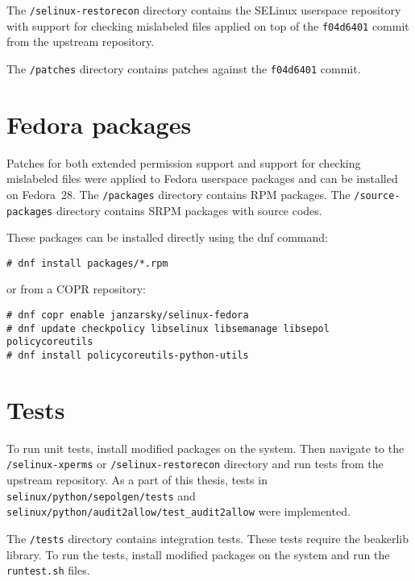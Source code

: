 The \texttt{/selinux-restorecon} directory contains the SELinux userspace
repository with support for checking mislabeled files applied on top of the
\texttt{f04d6401} commit from the upstream repository.

The \texttt{/patches} directory contains patches against the \texttt{f04d6401}
commit.

\section{Fedora packages}

Patches for both extended permission support and support for checking mislabeled
files were applied to Fedora userspace packages and can be installed on
Fedora~28. The \texttt{/packages} directory contains RPM packages. The
\texttt{/source-packages} directory contains SRPM packages with source codes.

These packages can be installed directly using the dnf command:
\begin{lstlisting}
# dnf install packages/*.rpm
\end{lstlisting}
or from a COPR repository:
\begin{lstlisting}
# dnf copr enable janzarsky/selinux-fedora
# dnf update checkpolicy libselinux libsemanage libsepol policycoreutils
# dnf install policycoreutils-python-utils
\end{lstlisting}

\section{Tests}
To run unit tests, install modified packages on the system. Then navigate to the
\\ \texttt{/selinux-xperms} or \texttt{/selinux-restorecon} directory and run
tests from the upstream repository. As a part of this thesis, tests in
\texttt{selinux/python/sepolgen/tests} and \\
\texttt{selinux/python/audit2allow/test\_audit2allow} were implemented.

The \texttt{/tests} directory contains integration tests. These tests require
the beakerlib library. To run the tests, install modified packages on the system
and run the \texttt{runtest.sh} files.

